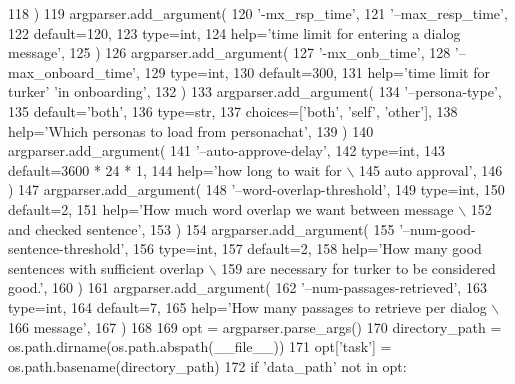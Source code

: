 \begin{DoxyCode}
118     )
119     argparser.add\_argument(
120         \textcolor{stringliteral}{'-mx\_rsp\_time'},
121         \textcolor{stringliteral}{'--max\_resp\_time'},
122         default=120,
123         type=int,
124         help=\textcolor{stringliteral}{'time limit for entering a dialog message'},
125     )
126     argparser.add\_argument(
127         \textcolor{stringliteral}{'-mx\_onb\_time'},
128         \textcolor{stringliteral}{'--max\_onboard\_time'},
129         type=int,
130         default=300,
131         help=\textcolor{stringliteral}{'time limit for turker'} \textcolor{stringliteral}{'in onboarding'},
132     )
133     argparser.add\_argument(
134         \textcolor{stringliteral}{'--persona-type'},
135         default=\textcolor{stringliteral}{'both'},
136         type=str,
137         choices=[\textcolor{stringliteral}{'both'}, \textcolor{stringliteral}{'self'}, \textcolor{stringliteral}{'other'}],
138         help=\textcolor{stringliteral}{'Which personas to load from personachat'},
139     )
140     argparser.add\_argument(
141         \textcolor{stringliteral}{'--auto-approve-delay'},
142         type=int,
143         default=3600 * 24 * 1,
144         help=\textcolor{stringliteral}{'how long to wait for  \(\backslash\)}
145 \textcolor{stringliteral}{                           auto approval'},
146     )
147     argparser.add\_argument(
148         \textcolor{stringliteral}{'--word-overlap-threshold'},
149         type=int,
150         default=2,
151         help=\textcolor{stringliteral}{'How much word overlap we want between message \(\backslash\)}
152 \textcolor{stringliteral}{                           and checked sentence'},
153     )
154     argparser.add\_argument(
155         \textcolor{stringliteral}{'--num-good-sentence-threshold'},
156         type=int,
157         default=2,
158         help=\textcolor{stringliteral}{'How many good sentences with sufficient overlap \(\backslash\)}
159 \textcolor{stringliteral}{                           are necessary for turker to be considered good.'},
160     )
161     argparser.add\_argument(
162         \textcolor{stringliteral}{'--num-passages-retrieved'},
163         type=int,
164         default=7,
165         help=\textcolor{stringliteral}{'How many passages to retrieve per dialog \(\backslash\)}
166 \textcolor{stringliteral}{                           message'},
167     )
168 
169     opt = argparser.parse\_args()
170     directory\_path = os.path.dirname(os.path.abspath(\_\_file\_\_))
171     opt[\textcolor{stringliteral}{'task'}] = os.path.basename(directory\_path)
172     \textcolor{keywordflow}{if} \textcolor{stringliteral}{'data\_path'} \textcolor{keywordflow}{not} \textcolor{keywordflow}{in} opt:

\end{DoxyCode}
